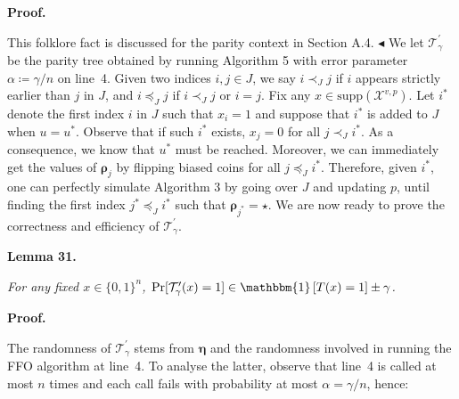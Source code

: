 \par\medskip\noindent\textbf{Proof.}\par




This folklore fact is discussed for the parity context in Section A.4.
$\blacktriangleleft$
We let $\mathcal{T}^{\prime}_{\gamma}$ be the parity tree obtained by running Algorithm 5 with error parameter $\alpha\coloneqq\gamma/n$ on line 4. Given two indices $i,j\in J$, we say $i\prec_{J}j$ if $i$ appears strictly earlier than $j$ in $J$, and $i\preceq_{J}j$ if $i\prec_{J}j$ or $i=j$. Fix any $x\in\mathrm{supp}(\mathcal{X}^{v,p})$. Let $i^{*}$ denote the first index $i$ in $J$ such that $x_{i}=1$ and suppose that $i^{*}$ is added to $J$ when $u=u^{*}$. Observe that if such $i^{*}$ exists, $x_{j}=0$ for all $j\prec_{J}i^{*}$. As a consequence, we know that $u^{*}$ must be reached. Moreover, we can immediately get the values of $\bm{\rho}_{j}$ by flipping biased coins for all $j\preceq_{J}i^{*}$. Therefore, given $i^{*}$, one can perfectly simulate Algorithm 3 by going over $J$ and updating $p$, until finding the first index $j^{*}\preceq_{J}i^{*}$ such that $\bm{\rho}_{j^{*}}=\star$. We are now ready to prove the correctness and efficiency of $\mathcal{T}^{\prime}_{\gamma}$.\par





\par\medskip\noindent\textbf{
\textbf{Lemma 31}\textbf{.}
}\par



\emph{For any fixed $x\in\{0,1\}^{n}$, $\Pr[\mathcal{T}^{\prime}_{\gamma}(x)=1]\in\mathbbm{1}\left[T(x)=1\right]\pm\gamma$.}\par







\par\medskip\noindent\textbf{Proof.}\par




The randomness of $\mathcal{T}^{\prime}_{\gamma}$ stems from $\bm{\eta}$ and the randomness involved in running the FFO algorithm at line 4. To analyse the latter, observe that line 4 is called at most $n$ times and each call fails with probability at most $\alpha=\gamma/n$, hence:\par



